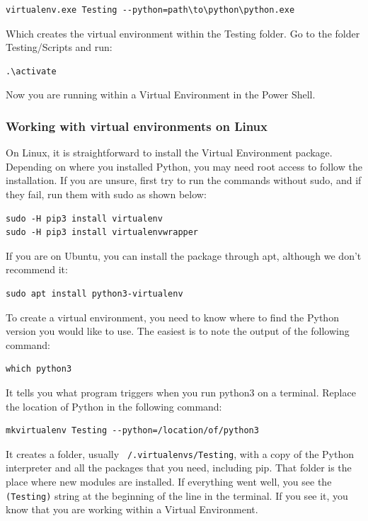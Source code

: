 \begin{verbatim}
virtualenv.exe Testing --python=path\to\python\python.exe
\end{verbatim}

Which creates the virtual environment within the Testing folder. Go to the folder Testing/Scripts and run:
\begin{verbatim}
.\activate
\end{verbatim}

Now you are running within a Virtual Environment in the Power Shell.

\subsubsection{Working with virtual environments on Linux}
On Linux, it is straightforward to install the Virtual Environment package. Depending on where you installed Python, you may need root access to follow the installation. If you are unsure, first try to run the commands without sudo, and if they fail, run them with sudo as shown below:

\begin{verbatim}
sudo -H pip3 install virtualenv
sudo -H pip3 install virtualenvwrapper
\end{verbatim}

If you are on Ubuntu, you can install the package through apt, although we don't recommend it:
\begin{verbatim}
sudo apt install python3-virtualenv
\end{verbatim}

To create a virtual environment, you need to know where to find the Python version you would like to use. The easiest is to note the output of the following command:

\begin{verbatim}
which python3
\end{verbatim}

It tells you what program triggers when you run python3 on a terminal. Replace the location of Python in the following command:
\begin{verbatim}
mkvirtualenv Testing --python=/location/of/python3
\end{verbatim}

It creates a folder, usually \texttt{~/.virtualenvs/Testing}, with a copy of the Python interpreter and all the packages that you need, including pip. That folder is the place where new modules are installed. If everything went well, you see the \texttt{(Testing)} string at the beginning of the line in the terminal. If you see it, you know that you are working within a Virtual Environment.

